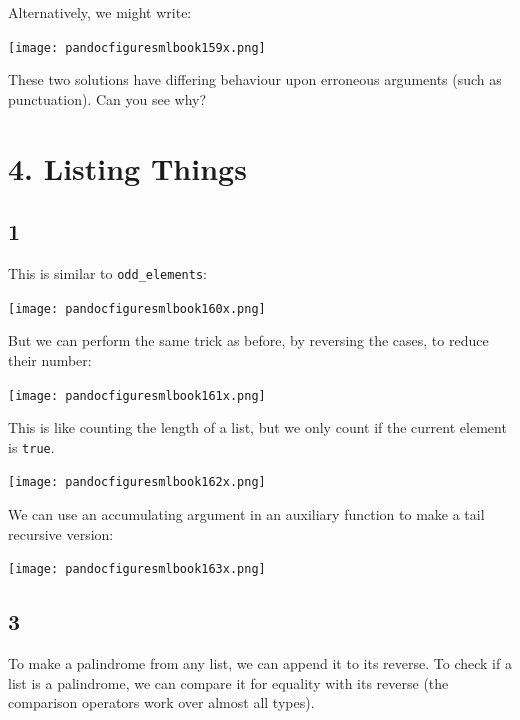 \documentclass[]{book}
\begin{document}
\noindent Alternatively, we might write:

\medskip
\begin{center}
\noindent\texttt{[image: pandocfiguresmlbook159x.png]}
\end{center}
\medskip

\noindent These two solutions have differing behaviour upon erroneous arguments (such as punctuation). Can you see why?

\section*{4. Listing Things}
\subsection*{1}
This is similar to \texttt{odd\_elements}:

\medskip
\begin{center}
\noindent\texttt{[image: pandocfiguresmlbook160x.png]}
\end{center}
\medskip

\noindent But we can perform the same trick as before, by reversing the cases, to reduce their number:

\medskip
\begin{center}
\noindent\texttt{[image: pandocfiguresmlbook161x.png]}
\end{center}
\medskip

\noindent This is like counting the length of a list, but we only count if the current element is \texttt{true}.

\medskip
\begin{center}
\noindent\texttt{[image: pandocfiguresmlbook162x.png]}
\end{center}
\medskip

\noindent We can use an accumulating argument in an auxiliary function to make a tail recursive version:

\medskip
\begin{center}
\noindent\texttt{[image: pandocfiguresmlbook163x.png]}
\end{center}
\medskip

\subsection*{3}

To make a palindrome from any list, we can append it to its reverse. To check if a list is a palindrome, we can compare it for equality with its reverse (the comparison operators work over almost all types).
\end{document}
